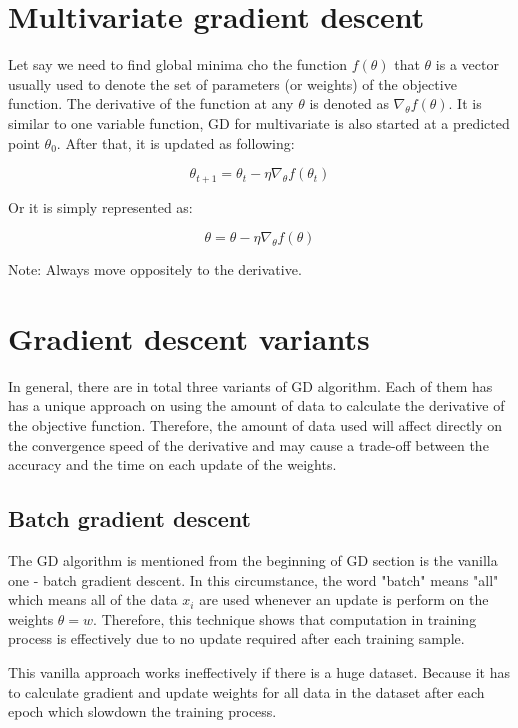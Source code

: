 	\section{Multivariate gradient descent}
	\noindent
	
	Let say we need to find global minima cho the function $f(\theta)$ that $\theta$ is a vector usually used to denote the set of parameters (or weights) of the objective function. The derivative of the function at any $\theta$ is denoted as $\nabla_{\theta}f(\theta)$. It is similar to one variable function, GD for multivariate is also started at a predicted point $\theta_0$. After that, it is updated as following:
	
	\[\theta_{t+1} = \theta_t - \eta\nabla_{\theta}f(\theta_t) \]
	
	\noindent	
	Or it is simply represented as:
	
	\[\theta = \theta - \eta\nabla_{\theta}f(\theta) \]
	
	\noindent
	Note: Always move oppositely to the derivative.
	
\section{Gradient descent variants}
	\noindent
	
	In general, there are in total three variants of GD algorithm. Each of them has has a unique approach on using the amount of data to calculate the derivative of the objective function. Therefore, the amount of data used will affect directly on the convergence speed of the derivative and may cause a trade-off between the accuracy and the time on each update of the weights.
	
	
	\subsection{Batch gradient descent}
	\noindent

	The GD algorithm is mentioned from the beginning of GD section is the vanilla one - batch gradient descent. In this circumstance, the word "batch" means "all" which means all of the data $x_i$ are used whenever an update is perform on the weights $\theta = w$. Therefore, this technique shows that computation in training process is effectively due to no update required after each training sample.
	
	This vanilla approach works ineffectively if there is a huge dataset. Because it has to calculate gradient and update weights for all data in the dataset after each epoch which slowdown the training process.
	
